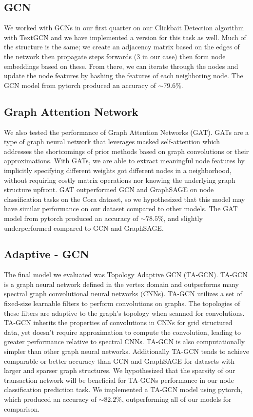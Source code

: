 \documentclass{article}
\begin{document}
\subsection{GCN}
	We worked with GCNs in our first quarter on our Clickbait Detection algorithm with TextGCN and we have implemented a version for this task as well. Much of the structure is the same; we create an adjacency matrix based on the edges of the network then propagate steps forwards (3 in our case) then form node embeddings based on these. From there, we can iterate through the nodes and update the node features by hashing the features of each neighboring node. The GCN model from pytorch produced an accuracy of $\sim$$79.6\%$.

\subsection{Graph Attention Network}
	We also tested the performance of Graph Attention Networks (GAT). GATs are a type of graph neural network that leverages masked self-attention which addresses the shortcomings of prior methods based on graph convolutions or their approximations. With GATs, we are able to extract meaningful node features by implicitly specifying different weights got different nodes in a neighborhood, without requiring costly matrix operations nor knowing the underlying graph structure upfront. GAT outperformed GCN and GraphSAGE on node classification tasks on the Cora dataset, so we hypothesized that this model may have similar performance on our dataset compared to other models. The GAT model from pytorch produced an accuracy of $\sim$$78.5\%$, and slightly underperformed compared to GCN and GraphSAGE.

\subsection{Adaptive - GCN}
	The final model we evaluated was Topology Adaptive GCN (TA-GCN). TA-GCN is a graph neural network defined in the vertex domain and outperforms many spectral graph convolutional neural networks (CNNs). TA-GCN utilizes a set of fixed-size learnable filters to perform convolutions on graphs. The topologies of these filters are adaptive to the graph’s topology when scanned for convolutions. TA-GCN inherits the properties of convolutions in CNNs for grid structured data, yet doesn’t require approximation to compute the convolution, leading to greater performance relative to spectral CNNs. TA-GCN is also computationally simpler than other graph neural networks. Additionally TA-GCN tends to achieve comparable or better accuracy than GCN and GraphSAGE for datasets with larger and sparser graph structures. We hypothesized that the sparsity of our transaction network will be beneficial for TA-GCNs performance in our node classification prediction task. We implemented a TA-GCN model using pytorch, which produced an accuracy of $\sim$$82.2\%$, outperforming all of our models for comparison.
 
\end{document}
